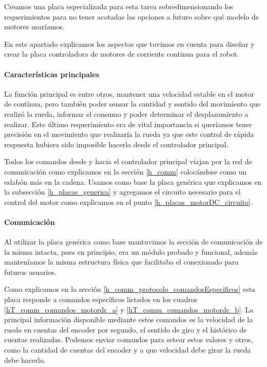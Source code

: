 Creamos una placa especializada para esta tarea sobredimensionando los requerimientos para no tener acotadas las opciones
a futuro sobre qu\'e modelo de motores usar\'iamos.

En este apartado explicamos los aspectos que tuvimos en cuenta para dise\~nar y crear la placa controladora de motores
de corriente continua para el robot.

\paragraph{Caracter\'isticas principales}
\label{h_placas_motorDC_caracteristicas}

La funci\'on principal es entre otros, mantener una velocidad estable en el motor de cont\'inua, pero tambi\'en poder sensar la cantidad
y sentido del movimiento que realiz\'o la rueda, informar el consumo y poder determinar el desplazamiento a realizar.
Este \'ultimo requerimiento era de vital importancia si quer\'iamos tener precisi\'on en el movimiento que realizar\'ia la rueda
ya que este control de r\'apida respuesta hubiera sido imposible hacerlo desde el controlador principal.

Todos los comandos desde y hacia el controlador principal viajan por la red de comunicaci\'on como explicamos en la secci\'on
\ref{h_comm} coloc\'andose como un eslab\'on m\'as en la cadena.
Usamos como base la placa gen\'erica que explicamos en la subsecci\'on \ref{h_placas_generica} y agregamos el circuito necesario para
el control del motor como explicamos en el punto \ref{h_placas_motorDC_circuito}.

\paragraph{Comunicaci\'on}
\label{h_placas_motorDC_comm}

Al utilizar la placa gen\'erica como base mantuvimos la secci\'on de comunicaci\'on de la misma intacta, pues
en principio, era un m\'odulo probado y funcional, adem\'as manten\'iamos la misma estructura f\'isica que
facilitaba el conexionado para futuros usuarios.

Como explicamos en la secci\'on \ref{h_comm_protocolo_comandosEspecificos} esta placa responde a comandos
espec\'ificos listados en los cuadros \ref{hT_comm_comandos_motordc_a} y  \ref{hT_comm_comandos_motordc_b}.
La principal informaci\'on disponible mediante estos comandos es la velocidad de la rueda en cuentas del
encoder por segundo, el sentido de giro y el hist\'orico de cuentas realizadas.
Podemos enviar comandos para setear estos valores y otros, como la cantidad de cuentas del encoder y a que
velocidad debe girar la rueda debe hacerlo.

